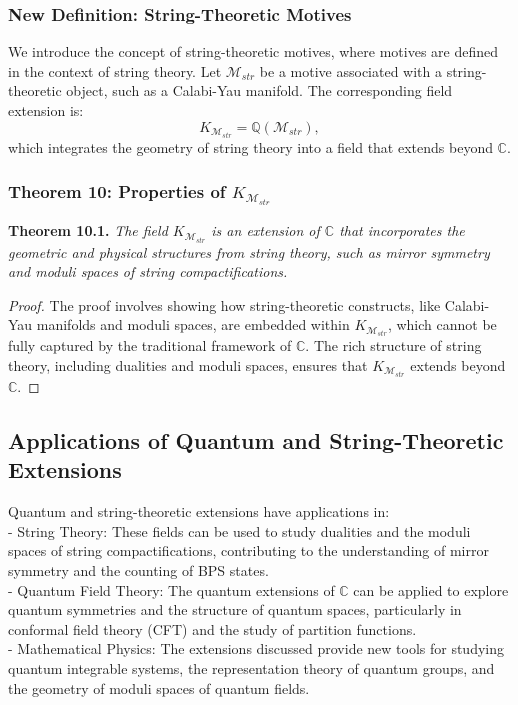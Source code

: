 \documentclass{article}
\begin{document}
\subsubsection{New Definition: String-Theoretic Motives}
We introduce the concept of string-theoretic motives, where motives are defined in the context of string theory. Let \(\mathcal{M}_{str}\) be a motive associated with a string-theoretic object, such as a Calabi-Yau manifold. The corresponding field extension is:
\[
K_{\mathcal{M}_{str}} = \mathbb{Q}(\mathcal{M}_{str}),
\]
which integrates the geometry of string theory into a field that extends beyond \(\mathbb{C}\).

\subsubsection{Theorem 10: Properties of \(K_{\mathcal{M}_{str}}\)}
\textbf{Theorem 10.1.} \textit{The field \(K_{\mathcal{M}_{str}}\) is an extension of \(\mathbb{C}\) that incorporates the geometric and physical structures from string theory, such as mirror symmetry and moduli spaces of string compactifications.}

\begin{proof}
The proof involves showing how string-theoretic constructs, like Calabi-Yau manifolds and moduli spaces, are embedded within \(K_{\mathcal{M}_{str}}\), which cannot be fully captured by the traditional framework of \(\mathbb{C}\). The rich structure of string theory, including dualities and moduli spaces, ensures that \(K_{\mathcal{M}_{str}}\) extends beyond \(\mathbb{C}\).
\end{proof}

\subsection{Applications of Quantum and String-Theoretic Extensions}
Quantum and string-theoretic extensions have applications in:
{\ }\\
- String Theory: These fields can be used to study dualities and the moduli spaces of string compactifications, contributing to the understanding of mirror symmetry and the counting of BPS states.
{\ }\\
- Quantum Field Theory: The quantum extensions of \(\mathbb{C}\) can be applied to explore quantum symmetries and the structure of quantum spaces, particularly in conformal field theory (CFT) and the study of partition functions.
{\ }\\
- Mathematical Physics: The extensions discussed provide new tools for studying quantum integrable systems, the representation theory of quantum groups, and the geometry of moduli spaces of quantum fields.
\end{document}
